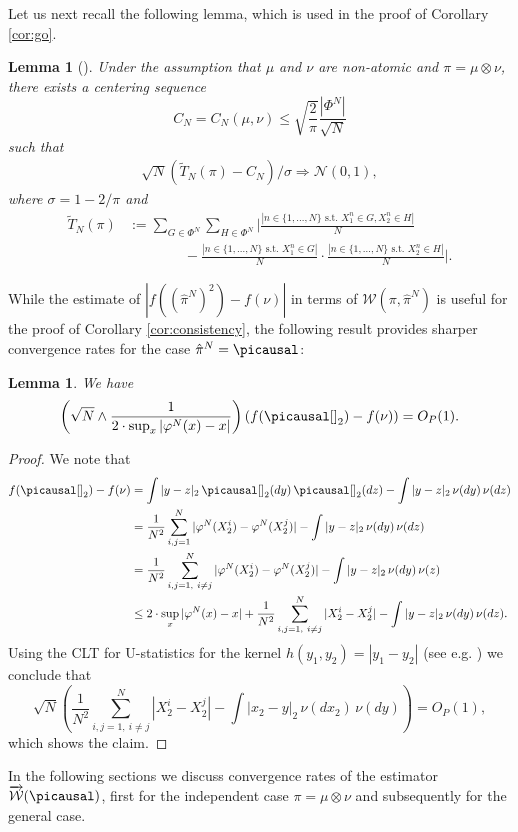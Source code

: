 \documentclass[10pt]{amsart}
\newtheorem{lemma}[theorem]{Lemma}
\begin{document}
\begin{appendix}
Let us next recall the following lemma, which is used in the proof of Corollary \ref{cor:go}.
\begin{lemma}[{\cite[Theorem 3]{gretton2010consistent}}]\label{prop:1}
Under the assumption that $\mu$ and $\nu$ are non-atomic and $\pi=\mu\otimes\nu$, there exists a centering sequence $$C_N= C_N(\mu,\nu)\le\sqrt{\frac{2}{\pi}}\frac{|\Phi^N|}{\sqrt{N}} $$ such that
\begin{align*}
\sqrt{N} (\tilde{T}_N(\pi)-C_N)/\sigma \Rightarrow \mathcal{N}(0,1),
\end{align*}
where $\sigma=1-2/\pi$ and
\begin{align*}
\tilde{T}_N(\pi)&:=
\sum_{G\in \Phi^N} \sum_{H\in\Phi^N} \Bigg|\frac{|n\in \{1,\dots, N\} \text{ s.t. } X_1^n\in G, X_2^n\in H|}{N}\\
&\qquad\qquad- \frac{|n\in \{1, \dots, N\} \text{ s.t. } X_1^n\in G|}{N}\cdot \frac{|n\in \{1,\dots, N\} \text{ s.t. } X_2^n\in H|}{N}\Bigg|.
\end{align*}
\end{lemma}


While the estimate of $|f((\hat{\pi}^N)^2)-f(\nu)|$ in terms of $\mathcal{W}(\pi, \hat{\pi}^N)$ is useful for the proof of Corollary \ref{cor:consistency}, the following result provides sharper convergence rates for the case $\hat{\pi}^N=\picausal$:

\begin{lemma}\label{lem:O}
We have
$$\left(\sqrt{N}\wedge \frac{1}{2\cdot \sup_{x} |\varphi^N(x)-x|} \right)\left(f(\picausal[]_2)-f(\nu)\right)=O_P(1).$$
\end{lemma}

\begin{proof}
We note that
\begin{align*}
f(\picausal[]_2)-f(\nu)&= \int |y-z|_2\, \picausal[]_2(dy)\, \picausal[]_2(dz) -\int |y-z|_2\,\nu(dy)\,\nu(dz)\\
&=\frac{1}{N^2} \sum_{i,j=1}^N |\varphi^N(X_2^i)- \varphi^N(X_2^j)| -\int |y-z|_2\,\nu(dy)\,\nu(dz)\\
&=\frac{1}{N^2} \sum_{i,j=1, \ i\neq j}^N |\varphi^N(X_2^i)- \varphi^N(X_2^j)| -\int |y-z|_2\,\nu(dy)\,\nu(z)\\
&\le 2\cdot \sup_{x} |\varphi^N(x)-x|+\frac{1}{N^2} \sum_{i,j=1, \ i\neq j}^N |X_2^i- X_2^j| -\int |y-z|_2\,\nu(dy)\,\nu(dz).
\end{align*}
Using the CLT for U-statistics for the kernel $h(y_1, y_2)=|y_1-y_2|$ (see e.g. \cite[Theorem 12.3]{van1998asymptotic}) we conclude that 
$$\sqrt{N}\left(\frac{1}{N^2} \sum_{i,j=1, \ i\neq j}^N |X_2^i- X_2^j| -\int |x_2-y|_2\,\nu(dx_2)\,\nu(dy)\right)=O_P(1),$$
which shows the claim.
\end{proof}
In the following sections we discuss convergence rates of the estimator $\overrightarrow{\mathcal{W}}(\picausal)$, first for the independent case $\pi=\mu\otimes\nu$ and subsequently for the general case.



\end{appendix}
\end{document}
